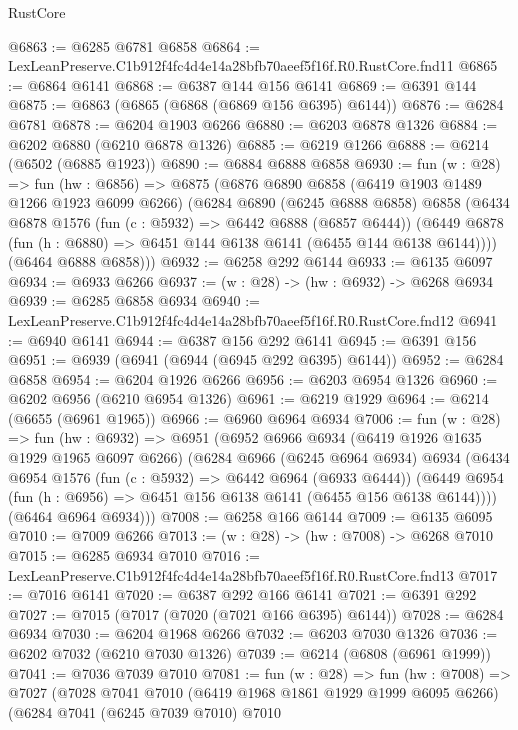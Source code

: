 \begin{lexlean}{RustCore}
\begin{coremodule}
@6863 := @6285 @6781 @6858
@6864 := LexLeanPreserve.C1b912f4fc4d4e14a28bfb70aeef5f16f.R0.RustCore.fnd11
@6865 := @6864 @6141
@6868 := @6387 @144 @156 @6141
@6869 := @6391 @144
@6875 := @6863 (@6865 (@6868 (@6869 @156 @6395) @6144))
@6876 := @6284 @6781
@6878 := @6204 @1903 @6266
@6880 := @6203 @6878 @1326
@6884 := @6202 @6880 (@6210 @6878 @1326)
@6885 := @6219 @1266
@6888 := @6214 (@6502 (@6885 @1923))
@6890 := @6884 @6888 @6858
@6930 := fun (w : @28) =>
  fun (hw : @6856) =>
  @6875
    (@6876
      @6890
      @6858
      (@6419 @1903 @1489 @1266 @1923 @6099 @6266)
      (@6284
        @6890
        (@6245 @6888 @6858)
        @6858
        (@6434
          @6878
          @1576
          (fun (c : @5932) => @6442 @6888 (@6857 @6444))
          (@6449 @6878 (fun (h : @6880) => @6451 @144 @6138 @6141 (@6455 @144 @6138 @6144))))
        (@6464 @6888 @6858)))
@6932 := @6258 @292 @6144
@6933 := @6135 @6097
@6934 := @6933 @6266
@6937 := (w : @28) -> (hw : @6932) -> @6268 @6934
@6939 := @6285 @6858 @6934
@6940 := LexLeanPreserve.C1b912f4fc4d4e14a28bfb70aeef5f16f.R0.RustCore.fnd12
@6941 := @6940 @6141
@6944 := @6387 @156 @292 @6141
@6945 := @6391 @156
@6951 := @6939 (@6941 (@6944 (@6945 @292 @6395) @6144))
@6952 := @6284 @6858
@6954 := @6204 @1926 @6266
@6956 := @6203 @6954 @1326
@6960 := @6202 @6956 (@6210 @6954 @1326)
@6961 := @6219 @1929
@6964 := @6214 (@6655 (@6961 @1965))
@6966 := @6960 @6964 @6934
@7006 := fun (w : @28) =>
  fun (hw : @6932) =>
  @6951
    (@6952
      @6966
      @6934
      (@6419 @1926 @1635 @1929 @1965 @6097 @6266)
      (@6284
        @6966
        (@6245 @6964 @6934)
        @6934
        (@6434
          @6954
          @1576
          (fun (c : @5932) => @6442 @6964 (@6933 @6444))
          (@6449 @6954 (fun (h : @6956) => @6451 @156 @6138 @6141 (@6455 @156 @6138 @6144))))
        (@6464 @6964 @6934)))
@7008 := @6258 @166 @6144
@7009 := @6135 @6095
@7010 := @7009 @6266
@7013 := (w : @28) -> (hw : @7008) -> @6268 @7010
@7015 := @6285 @6934 @7010
@7016 := LexLeanPreserve.C1b912f4fc4d4e14a28bfb70aeef5f16f.R0.RustCore.fnd13
@7017 := @7016 @6141
@7020 := @6387 @292 @166 @6141
@7021 := @6391 @292
@7027 := @7015 (@7017 (@7020 (@7021 @166 @6395) @6144))
@7028 := @6284 @6934
@7030 := @6204 @1968 @6266
@7032 := @6203 @7030 @1326
@7036 := @6202 @7032 (@6210 @7030 @1326)
@7039 := @6214 (@6808 (@6961 @1999))
@7041 := @7036 @7039 @7010
@7081 := fun (w : @28) =>
  fun (hw : @7008) =>
  @7027
    (@7028
      @7041
      @7010
      (@6419 @1968 @1861 @1929 @1999 @6095 @6266)
      (@6284
        @7041
        (@6245 @7039 @7010)
        @7010

\end{coremodule}
\end{lexlean}
